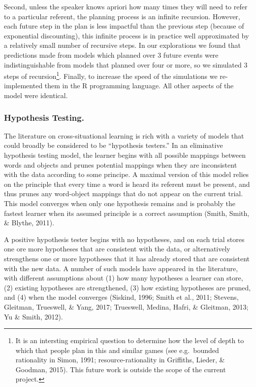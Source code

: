 \documentclass[english,,man,floatsintext]{apa6}
\begin{document}
Second, unless the speaker knows apriori how many times they will need to refer to a particular referent, the planning process is an infinite recursion. However, each future step in the plan is less impactful than the previous step (because of exponential discounting), this infinite process is in practice well approximated by a relatively small number of recursive steps. In our explorations we found that predictions made from models which planned over 3 future events were indistinguishable from models that planned over four or more, so we simulated 3 steps of recursion\footnote{It is an intersting empirical question to determine how the level of depth to which that people plan in this and similar games (see e.g.~bounded rationality in Simon, 1991; resource-rationality in Griffiths, Lieder, \& Goodman, 2015). This future work is outside the scope of the current project.}. Finally, to increase the speed of the simulations we re-implemented them in the R programming language. All other aspects of the model were identical.

\hypertarget{hypothesis-testing.}{%
\subsubsection{Hypothesis Testing.}\label{hypothesis-testing.}}

The literature on cross-situational learning is rich with a variety of models that could broadly be considered to be \enquote{hypothesis testers.} In an eliminative hypothesis testing model, the learner begins with all possible mappings between words and objects and prunes potential mappings when they are inconsistent with the data according to some principe. A maximal version of this model relies on the principle that every time a word is heard its referent must be present, and thus prunes any word-object mappings that do not appear on the current trial. This model converges when only one hypothesis remains and is probably the fastest learner when its assumed principle is a correct assumption (Smith, Smith, \& Blythe, 2011).

A positive hypothesis tester begins with no hypotheses, and on each trial stores one ore more hypotheses that are consistent with the data, or alternatively strengthens one or more hypotheses that it has already stored that are consistent with the new data. A number of such models have appeared in the literature, with different assumptions about (1) how many hypotheses a learner can store, (2) existing hypotheses are strengthened, (3) how existing hypotheses are pruned, and (4) when the model converges (Siskind, 1996; Smith et al., 2011; Stevens, Gleitman, Trueswell, \& Yang, 2017; Trueswell, Medina, Hafri, \& Gleitman, 2013; Yu \& Smith, 2012).
\end{document}
